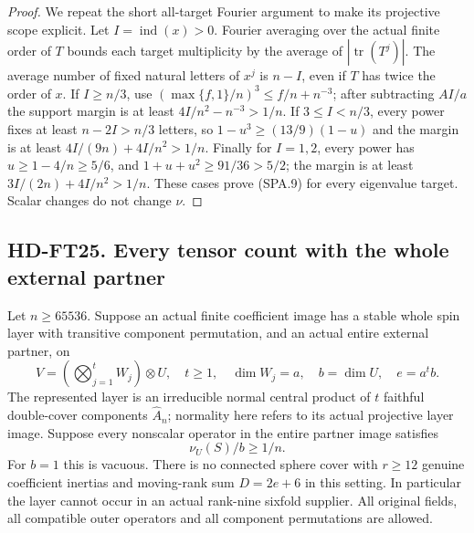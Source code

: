 \begin{proof}
We repeat the short all-target Fourier argument to make its
projective scope explicit.  Let $I=\operatorname{ind}(x)>0$.
Fourier averaging over the actual finite order of $T$ bounds each
target multiplicity by the average of $|\operatorname{tr}(T^j)|$.
The average number of fixed natural letters of $x^j$ is $n-I$,
even if $T$ has twice the order of $x$.
If $I\ge n/3$, use
$(\max\{f,1\}/n)^3\le f/n+n^{-3}$; after subtracting $AI/a$
the support margin is at least $4I/n^2-n^{-3}>1/n$.
If $3\le I<n/3$, every power fixes at least $n-2I>n/3$
letters, so $1-u^3\ge(13/9)(1-u)$ and the margin is at least
$4I/(9n)+4I/n^2>1/n$.
Finally for $I=1,2$, every power has $u\ge1-4/n\ge5/6$,
and $1+u+u^2\ge91/36>5/2$; the margin is at least
$3I/(2n)+4I/n^2>1/n$.  These cases prove (SPA.9) for every
eigenvalue target.  Scalar changes do not change $\nu$.
\end{proof}

\subsection*{HD-FT25. Every tensor count with the whole external partner}

\begin{theorem}[HD-FT25]
Let $n\ge65536$.  Suppose an actual finite coefficient image has
a stable whole spin layer with transitive component permutation,
and an actual entire external partner, on
\[
 V=\left(\bigotimes_{j=1}^t W_j\right)\otimes U,
 \quad t\ge1,\quad \dim W_j=a,\quad b=\dim U,\quad e=a^tb.
 \tag{SPA.13}
\]
The represented layer is an irreducible normal central product of
$t$ faithful double-cover components $\widehat A_n$; normality
here refers to its actual projective layer image.  Suppose every
nonscalar operator in the entire partner image satisfies
\[
                         \nu_U(S)/b\ge1/n.
 \tag{SPA.14}
\]
For $b=1$ this is vacuous.  There is no connected sphere cover
with $r\ge12$ genuine coefficient inertias and moving-rank sum
$D=2e+6$ in this setting.  In particular the layer cannot occur
in an actual rank-nine sixfold supplier.  All original fields,
all compatible outer operators and all component permutations
are allowed.
\end{theorem}

